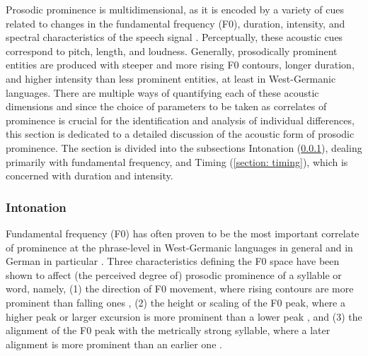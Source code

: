 Prosodic prominence is multidimensional, as it is encoded by a variety of cues related to changes in the fundamental frequency (F0), duration, intensity, and spectral characteristics of the speech signal \citep[e.g.,][]{baumannWhatMakesWord2018, fryDurationIntensityPhysical1955, kochanskiLoudnessPredictsProminence2005, liebermanAcousticCorrelatesWord1960, roessigTracingPhoneticSpace2022, sluijterSpectralBalanceAcoustic1996}. Perceptually, these acoustic cues correspond to pitch, length, and loudness. Generally, prosodically prominent entities are produced with steeper and more rising F0 contours, longer duration, and higher intensity than less prominent entities, at least in West-Germanic languages. There are multiple ways of quantifying each of these acoustic dimensions and since the choice of parameters to be taken as correlates of prominence is crucial for the identification and analysis of individual differences, this section is dedicated to a detailed discussion of the acoustic form of prosodic prominence. The section is divided into the subsections Intonation (\ref{sec:background_F0}), dealing primarily with fundamental frequency, and Timing (\ref{section: timing}), which is concerned with duration and intensity.

\subsubsection{Intonation} \label{sec:background_F0}

Fundamental frequency (F0) has often proven to be the most important correlate of prominence at the phrase-level in West-Germanic languages in general \citep{bolingerTheoryPitchAccent1958, fryExperimentsPerceptionStress1958, liebermanAcousticCorrelatesWord1960, thartPerceptualStudyIntonation1990, bishopPhonologyPhoneticsSignalextrinsic2020, severijnenYourVOORnaamNot2024} and in German in particular \citep{arnoldUsingGeneralizedAdditive2013, niebuhrRelativeCueingPower2017, baumannWhatMakesWord2018, roessigTracingPhoneticSpace2022}. Three characteristics defining the F0 space have been shown to affect (the perceived degree of) prosodic prominence of a syllable or word, namely, (1) the direction of F0 movement, where rising contours are more prominent than falling ones \citep{baumannImportanceTonalCues2014, baumannPerceptualProminencePitch2015}, (2) the height or scaling of the F0 peak, where a higher peak or larger excursion is more prominent than a lower peak \citep{rietveldRelationPitchExcursion1985, laddPerceptionIntonationalEmphasis1997, knightShapeNuclearFalls2008,  baumannPerceptualProminencePitch2015}, and (3) the alignment of the F0 peak with the metrically strong syllable, where a later alignment is more prominent than an earlier one \citep{laddPerceptionIntonationalEmphasis1997, kohlerTimingCommunicativeFunctions2005, niebuhrPerzeptionUndKognitive2007}. 

